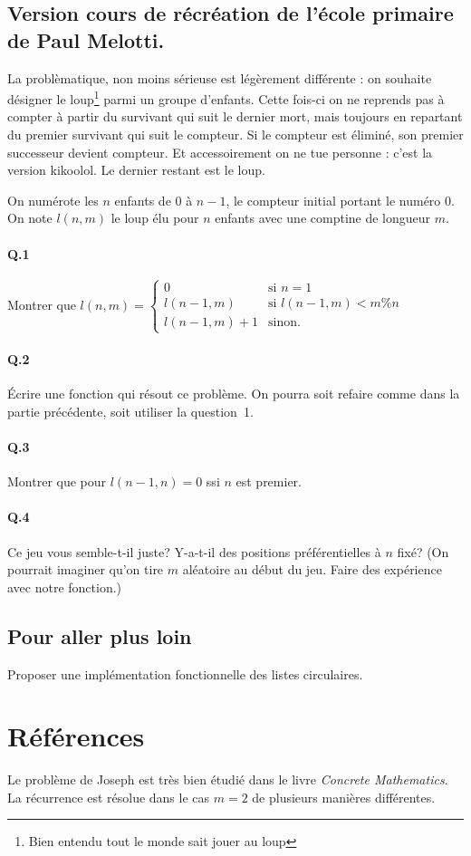 \documentclass[10pt,a4paper]{article}
\begin{document}
\subsection{Version cours de récréation de l'école primaire de Paul Melotti.}
La problèmatique, non moins sérieuse est légèrement différente : on souhaite désigner le loup\footnote{Bien entendu tout le monde sait jouer au loup} parmi un groupe d'enfants.
Cette fois-ci on ne reprends pas à compter à partir du survivant qui suit le dernier mort, mais toujours en repartant du premier survivant qui suit le compteur. Si le compteur est éliminé, son premier successeur devient compteur.
Et accessoirement on ne tue personne : c'est la version kikoolol. Le dernier restant est le loup.

On numérote les $n$ enfants de $0$ à $n-1$, le compteur initial portant le numéro $0$. On note $l(n,m)$ le loup élu pour $n$ enfants avec une comptine de longueur $m$.

\paragraph{Q.1} Montrer que $l(n,m) = \left\{
	\begin{array}{ll}
		0  & \mbox{si } n = 1 \\
		l(n-1,m) & \mbox{si } l(n-1,m) < m \% n \\
		l(n-1,m) + 1 & \mbox{sinon}.
	\end{array}
\right. $
\paragraph{Q.2} Écrire une fonction qui résout ce problème. On pourra soit refaire comme dans la partie précédente, soit utiliser la question 1.
\paragraph{Q.3} Montrer que pour $l(n-1,n) = 0$ ssi $n$ est premier.
\paragraph{Q.4} Ce jeu vous semble-t-il juste? Y-a-t-il des positions préférentielles à $n$ fixé? (On pourrait imaginer qu'on tire $m$ aléatoire au début du jeu. Faire des expérience avec notre fonction.)
\subsection{Pour aller plus loin}
Proposer une implémentation fonctionnelle des listes circulaires.
\section{Références}
Le problème de Joseph est très bien étudié dans le livre \emph{Concrete Mathematics}. La récurrence est résolue dans le cas $m=2$ de plusieurs manières différentes.
\end{document}
